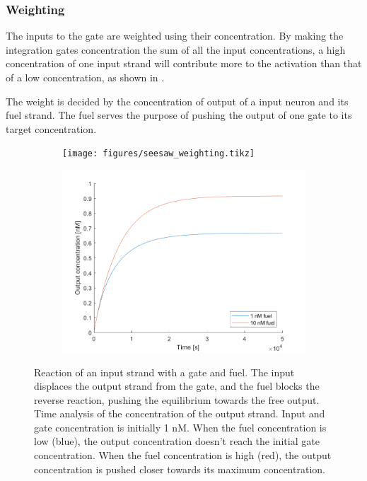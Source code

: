 \subsubsection{Weighting}
The inputs to the gate are weighted using their concentration. By making the integration gates concentration the sum of all the input concentrations, a high concentration of one input strand will contribute more to the activation than that of a low concentration, as shown in .

The weight is decided by the concentration of output of a input neuron and its fuel strand. The fuel serves the purpose of pushing the output of one gate to its target concentration.

\begin{figure}[h]
\begin{subfigure}[t]{.49\textwidth}
  \texttt{[image: figures/seesaw\_weighting.tikz]}
  \caption{}
  \label{seesaw_weighting_reaction}
\end{subfigure}
\hfill
\begin{subfigure}[t]{.49\columnwidth}
  \includegraphics[width=\linewidth]{images/weighting.png}
  \caption{}
  \label{seesaw_weighting_analysis}
\end{subfigure}
\caption{ Reaction of an input strand with a gate and fuel. The input displaces the output strand from the gate, and the fuel blocks the reverse reaction, pushing the equilibrium towards the free output.  Time analysis of the concentration of the output strand. Input and gate concentration is initially 1 nM. When the fuel concentration is low (blue), the output concentration doesn't reach the initial gate concentration. When the fuel concentration is high (red), the output concentration is pushed closer towards its maximum concentration.}
\label{seesaw_weighting}
\end{figure}

